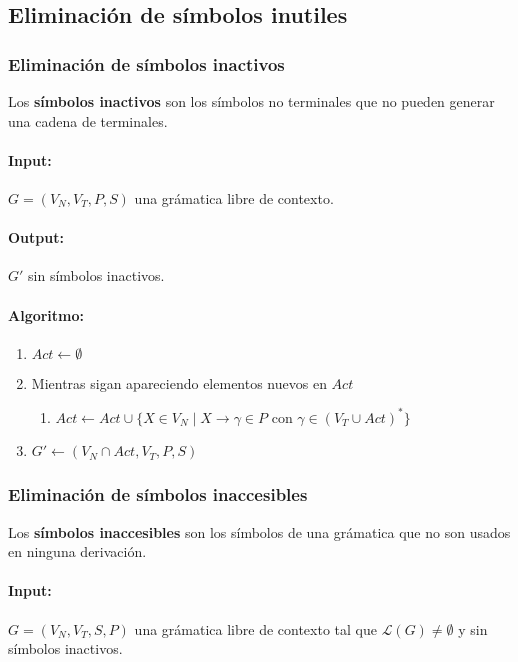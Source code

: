 \subsection{Eliminación de símbolos inutiles}
\subsubsection{Eliminación de símbolos inactivos}
Los \textbf{símbolos inactivos} son los símbolos no terminales que no pueden generar una cadena de terminales.

\paragraph{Input:} \(G = (V_N, V_T, P, S)\) una grámatica libre de contexto.
\paragraph{Output:} \(G'\) sin símbolos inactivos.

\paragraph{Algoritmo:}
\begin{enumerate}
  \item \(Act\leftarrow\emptyset\)
  \item Mientras sigan apareciendo elementos nuevos en \(Act\)
        \begin{enumerate}
          \item[] \(Act\leftarrow Act\cup\{ X\in V_N\mid X\to\gamma\in P\) con \(\gamma\in(V_T\cup Act)^*\}\)
        \end{enumerate}
  \item \(G'\leftarrow (V_N\cap Act, V_T, P, S)\)
\end{enumerate}
\subsubsection{Eliminación de símbolos inaccesibles}
Los \textbf{símbolos inaccesibles} son los símbolos de una grámatica que no son usados en ninguna derivación.

\paragraph{Input:} \(G = (V_N, V_T, S, P)\) una grámatica libre de contexto tal que \(\mathcal{L}(G)\neq\emptyset\) y sin símbolos inactivos.

